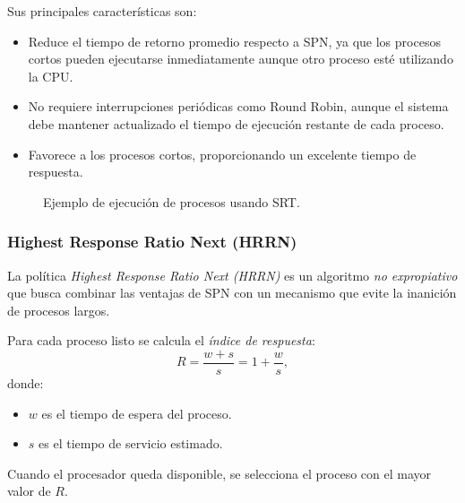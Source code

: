 Sus principales características son:
\begin{itemize}
  \item Reduce el tiempo de retorno promedio respecto a SPN, ya que los procesos cortos pueden ejecutarse inmediatamente aunque otro proceso esté utilizando la CPU.
  \item No requiere interrupciones periódicas como Round Robin, aunque el sistema debe mantener actualizado el tiempo de ejecución restante de cada proceso.
  \item Favorece a los procesos cortos, proporcionando un excelente tiempo de respuesta.
\end{itemize}

\begin{figure}[!ht]
  \centering
  \caption{Ejemplo de ejecución de procesos usando SRT.}
\end{figure}

\subsubsection{Highest Response Ratio Next (HRRN)}

La política \textit{Highest Response Ratio Next (HRRN)} es un algoritmo \textit{no expropiativo} que busca combinar las ventajas de SPN con un mecanismo que evite la inanición de procesos largos.

Para cada proceso listo se calcula el \textit{índice de respuesta}:
\[
R=\frac{w+s}{s}=1+\frac{w}{s},
\]
donde:
\begin{itemize}
  \item \(w\) es el tiempo de espera del proceso.
  \item \(s\) es el tiempo de servicio estimado.
\end{itemize}
Cuando el procesador queda disponible, se selecciona el proceso con el mayor valor de \(R\).

